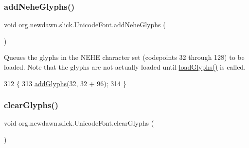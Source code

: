 \subsubsection{\texorpdfstring{add\+Nehe\+Glyphs()}{addNeheGlyphs()}}
{\footnotesize\ttfamily void org.\+newdawn.\+slick.\+Unicode\+Font.\+add\+Nehe\+Glyphs (\begin{DoxyParamCaption}{ }\end{DoxyParamCaption})\hspace{0.3cm}{\ttfamily [inline]}}

Queues the glyphs in the N\+E\+HE character set (codepoints 32 through 128) to be loaded. Note that the glyphs are not actually loaded until \mbox{\hyperlink{classorg_1_1newdawn_1_1slick_1_1_unicode_font_abf14d8ad33f80b66e14990417bd04088}{load\+Glyphs()}} is called. 
\begin{DoxyCode}
312                                  \{
313         \mbox{\hyperlink{classorg_1_1newdawn_1_1slick_1_1_unicode_font_a54603f9fb72e1339e669be73d08a3963}{addGlyphs}}(32, 32 + 96);
314     \}
\end{DoxyCode}
\mbox{\label{classorg_1_1newdawn_1_1slick_1_1_unicode_font_acb2f2c11e0827f39efb939bc10e5f755}} 
\subsubsection{\texorpdfstring{clear\+Glyphs()}{clearGlyphs()}}
{\footnotesize\ttfamily void org.\+newdawn.\+slick.\+Unicode\+Font.\+clear\+Glyphs (\begin{DoxyParamCaption}{ }\end{DoxyParamCaption})\hspace{0.3cm}{\ttfamily [inline]}}

